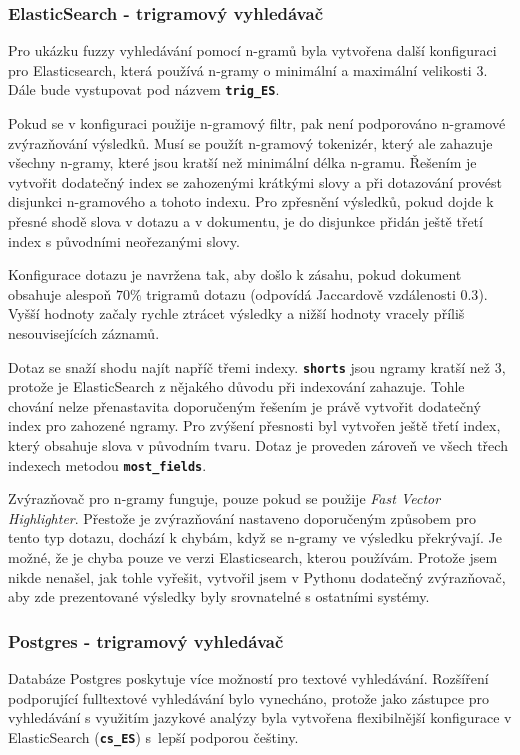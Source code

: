 \documentclass[11pt,letterpaper,oneside,openright]{book}
\newcommand{\bftt}[1]{\texttt{\textbf{#1}}}
\begin{document}
\subsubsection{ElasticSearch - trigramový vyhledávač} \label{sec:trigram_implementation}
Pro ukázku fuzzy vyhledávání pomocí n-gramů byla vytvořena další konfiguraci
pro Elasticsearch, která používá n-gramy o minimální a maximální velikosti 3.
Dále bude vystupovat pod názvem \bftt{trig\_ES}.

Pokud se v konfiguraci použije n-gramový filtr, pak není podporováno n-gramové
zvýrazňování výsledků. Musí se použít n-gramový tokenizér, který ale zahazuje
všechny n-gramy, které jsou kratší než minimální délka n-gramu. Řešením je
vytvořit dodatečný index se zahozenými krátkými slovy a při dotazování provést
disjunkci n-gramového a tohoto indexu. Pro zpřesnění výsledků, pokud dojde k
přesné shodě slova v dotazu a v dokumentu, je do disjunkce přidán ještě třetí
index s původními neořezanými slovy.

Konfigurace dotazu je navržena tak, aby došlo k zásahu, pokud dokument obsahuje
alespoň $70\%$ trigramů dotazu (odpovídá Jaccardově vzdálenosti $0.3$). Vyšší
hodnoty začaly rychle ztrácet výsledky a nižší hodnoty vracely příliš
nesouvisejících záznamů.

Dotaz se snaží shodu najít napříč třemi indexy. \bftt{shorts} jsou ngramy
kratší než $3$, protože je ElasticSearch z nějakého důvodu při indexování
zahazuje. Tohle chování nelze přenastavita doporučeným řešením je právě
vytvořit dodatečný index pro zahozené ngramy. Pro zvýšení přesnosti byl
vytvořen ještě třetí index, který obsahuje slova v původním tvaru. Dotaz je
proveden zároveň ve všech třech indexech metodou \bftt{most\_fields}.

Zvýrazňovač pro n-gramy funguje, pouze pokud se použije \textit{Fast Vector
Highlighter}. Přestože je zvýrazňování nastaveno doporučeným způsobem pro tento
typ dotazu, dochází k chybám, když se n-gramy ve výsledku překrývají. Je možné,
že je chyba pouze ve verzi Elasticsearch, kterou používám. Protože jsem nikde
nenašel, jak tohle vyřešit, vytvořil jsem v Pythonu dodatečný zvýrazňovač, aby
zde prezentované výsledky byly srovnatelné s ostatními systémy.

\subsubsection{Postgres - trigramový vyhledávač}
Databáze Postgres poskytuje více možností pro textové vyhledávání. Rozšíření
podporující fulltextové vyhledávání bylo vynecháno, protože jako zástupce pro
vyhledávání s využitím jazykové analýzy byla vytvořena flexibilnější
konfigurace v ElasticSearch (\bftt{cs\_ES}) s~lepší podporou češtiny.
\end{document}
